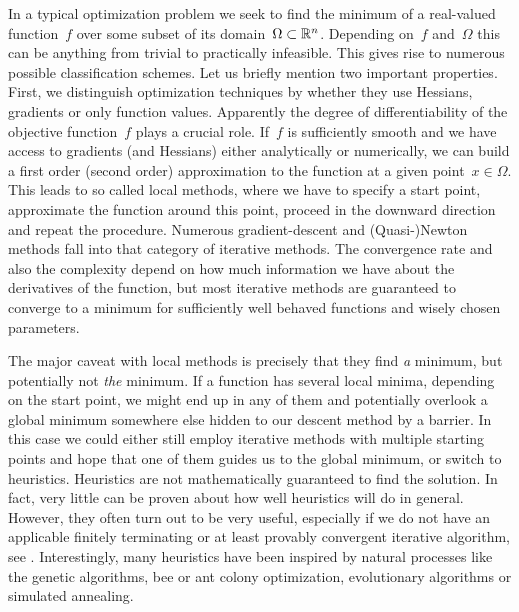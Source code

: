 In a typical optimization problem we seek to find the minimum of a real-valued
function~$f$ over some subset of its domain~$\Omega \subset \mathbb{R}^n$. Depending
on~$f$ and~$\Omega$ this can be anything from trivial to practically infeasible.
This gives rise to numerous possible classification schemes. Let us briefly
mention two important properties. First, we distinguish optimization techniques
by whether they use Hessians, gradients or only function values. Apparently the
degree of differentiability of the objective function~$f$ plays a crucial role.
If~$f$ is sufficiently smooth and we have access to gradients (and Hessians)
either analytically or numerically, we can build a first order (second order)
approximation to the function at a given point~$x \in \Omega$. This leads to so
called local methods, where we have to specify a start point, approximate the
function around this point, proceed in the downward direction and repeat the
procedure. Numerous gradient-descent and (Quasi-)Newton methods fall into that
category of iterative methods. The convergence rate and also the complexity
depend on how much information we have about the derivatives of the function,
but most iterative methods are guaranteed to converge to a minimum for
sufficiently well behaved functions and wisely chosen parameters.

The major caveat with local methods is precisely that they find \emph{a}
minimum, but potentially not \emph{the} minimum. If a function has several local
minima, depending on the start point, we might end up in any of them and
potentially overlook a global minimum somewhere else hidden to our descent
method by a barrier. In this case we could either still employ iterative methods
with multiple starting points and hope that one of them guides us to the global
minimum, or switch to heuristics. Heuristics are not mathematically guaranteed
to find the solution. In fact, very little can be proven about how well
heuristics will do in general. However, they often turn out to be very useful,
especially if we do not have an applicable finitely terminating or at least
provably convergent iterative algorithm, see .
Interestingly, many heuristics have been inspired by natural processes like the
genetic algorithms, bee or ant colony optimization, evolutionary algorithms or
simulated annealing.

